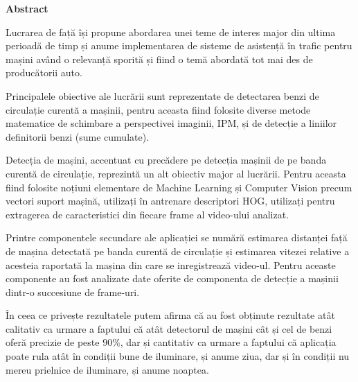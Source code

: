 \thispagestyle{plain}

\begin{center}
	\Large \textbf{Abstract}	
\end{center}

Lucrarea de față își propune abordarea unei teme de interes major din ultima perioadă de timp și anume implementarea de sisteme de asistență în trafic pentru mașini având o relevanță sporită și fiind o temă abordată tot mai des de producătorii auto. 

Principalele obiective ale lucrării sunt reprezentate de detectarea benzi de circulație curentă a mașinii, pentru aceasta fiind folosite diverse metode matematice de schimbare a perspectivei imaginii, IPM, și de detecție a liniilor definitorii benzi (sume cumulate).

Detecția de mașini, accentuat cu precădere pe detecția mașinii de pe banda curentă de circulație, reprezintă un alt obiectiv major al lucrării. Pentru aceasta fiind folosite noțiuni elementare de Machine Learning și Computer Vision precum vectori suport mașină, utilizați în antrenare descriptori HOG, utilizați pentru extragerea de caracteristici din fiecare frame al video-ului analizat.

Printre componentele secundare ale aplicației se numără estimarea distanței față de mașina detectată pe banda curentă de circulație și estimarea vitezei relative a acesteia raportată la mașina din care se inregistrează video-ul. Pentru aceaste componente au fost analizate date oferite de componenta de detecție a mașinii dintr-o succesiune de frame-uri.

În ceea ce privește rezultatele putem afirma că au fost obținute rezultate atât calitativ ca urmare a faptului că atât detectorul de mașini cât și cel de benzi oferă precizie de peste $90\%$, dar și cantitativ ca urmare a faptului că aplicația poate rula atât în condiții bune de iluminare, și anume ziua, dar și în condiții nu mereu prielnice de iluminare, și anume noaptea.
\vspace*{\fill}
